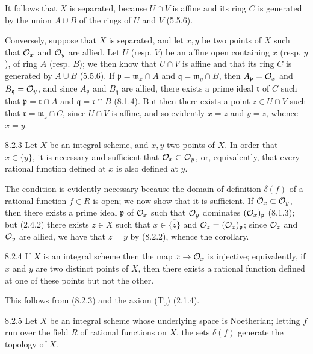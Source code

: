\documentclass[../main.tex]{subfiles}
\begin{document}
It follows that $X$ is separated, because $U\cap V$ is affine and its ring $C$ is generated by the union $A\cup B$ of the rings of $U$ and $V$ (5.5.6).

Conversely, suppose that $X$ is separated, and let $x,y$ be two points of $X$ such that $\mathcal{O}_x$ and $\mathcal{O}_y$ are allied.
Let $U$ (resp. $V$) be an affine open containing $x$ (resp. $y$), of ring $A$ (resp. $B$); we then know that $U\cap V$ is affine and that its ring $C$ is generated by $A\cup B$ (5.5.6).
If $\mathfrak{p}=\mathfrak{m}_x\cap A$ and $\mathfrak{q}=\mathfrak{m}_y\cap B$, then $A_\mathfrak{p}=\mathcal{O}_x$ and $B_\mathfrak{q}=\mathcal{O}_y$, and since $A_\mathfrak{p}$ and $B_\mathfrak{q}$ are allied, there exists a prime ideal $\mathfrak{r}$ of $C$ such that $\mathfrak{p}=\mathfrak{r}\cap A$ and $\mathfrak{q}=\mathfrak{r}\cap B$ (8.1.4).
But then there exists a point $z\in U\cap V$ such that $\mathfrak{r}=\mathfrak{m}_z\cap C$, since $U\cap V$ is affine, and so evidently $x=z$ and $y=z$, whence $x=y$.

\begin{cx}[Corollary]{8.2.3}
    Let $X$ be an integral scheme, and $x,y$ two points of $X$.
    In order that $x\in\overline{\{y\}}$, it is necessary and sufficient that $\mathcal{O}_x\subset\mathcal{O}_y$, or, equivalently, that every rational function defined at $x$ is also defined at $y$.
\end{cx}    

The condition is evidently necessary because the domain of definition $\delta(f)$ of a rational function $f\in R$ is open; we now show that it is sufficient.
If $\mathcal{O}_x\subset\mathcal{O}_y$, then there exists a prime ideal $\mathfrak{p}$ of $\mathcal{O}_x$ such that $\mathcal{O}_y$ dominates $(\mathcal{O}_x)_\mathfrak{p}$ (8.1.3); but (2.4.2) there exists $z\in X$ such that $x\in\overline{\{z\}}$ and $\mathcal{O}_z=(\mathcal{O}_x)_\mathfrak{p}$; since $\mathcal{O}_z$ and $\mathcal{O}_y$ are allied, we have that $z=y$ by (8.2.2), whence the corollary.

\begin{cx}[Corollary]{8.2.4}
    If $X$ is an integral scheme then the map $x\to\mathcal{O}_x$ is injective; equivalently, if $x$ and $y$ are two distinct points of $X$, then there exists a rational function defined at one of these points but not the other.
\end{cx}

This follows from (8.2.3) and the axiom ($\mathrm{T}_0$) (2.1.4).

\begin{cx}[Corollary]{8.2.5}
    Let $X$ be an integral scheme whose underlying space is Noetherian; letting $f$ run over the field $R$ of rational functions on $X$, the sets $\delta(f)$ generate the topology of $X$.
\end{cx}
\end{document}
